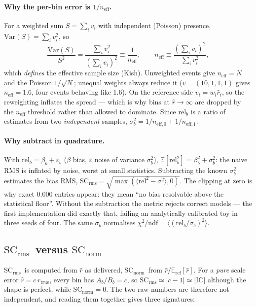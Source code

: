 \documentclass[11pt]{article}
\newcommand{\IC}{\ensuremath{\mathrm{IC}}}
\newcommand{\SCr}{\ensuremath{\mathrm{SC_{rms}}}}
\newcommand{\SCn}{\ensuremath{\mathrm{SC_{norm}}}}
\newcommand{\Eref}{\ensuremath{\mathbb{E}_{\mathrm{ref}}}}
\begin{document}
\paragraph{Why the per-bin error is $1/n_{\mathrm{eff}}$.} For a weighted sum
$S=\sum_i v_i$ with independent (Poisson) presence, $\mathrm{Var}(S)=\sum_i v_i^2$, so
%
\begin{equation}
\frac{\mathrm{Var}(S)}{S^2}=\frac{\sum_i v_i^2}{(\sum_i v_i)^2}\equiv\frac{1}{n_{\mathrm{eff}}},
\qquad n_{\mathrm{eff}}\equiv\frac{(\sum_i v_i)^2}{\sum_i v_i^2},
\end{equation}
%
which \emph{defines} the effective sample size (Kish). Unweighted events give
$n_{\mathrm{eff}}=N$ and the Poisson $1/\sqrt N$; unequal weights always reduce it
($v=(10,1,1,1)$ gives $n_{\mathrm{eff}}=1.6$, four events behaving like 1.6). On the
reference side $v_i = w_i\hat r_i$, so the reweighting inflates the spread --- which is why
bins at $\hat r\to\infty$ are dropped by the $n_{\mathrm{eff}}$ threshold rather than
allowed to dominate. Since $\mathrm{rel}_b$ is a ratio of estimates from two
\emph{independent} samples, $\sigma_b^2 = 1/n_{\mathrm{eff},0}+1/n_{\mathrm{eff},1}$.

\paragraph{Why subtract in quadrature.} With
$\mathrm{rel}_b=\beta_b+\varepsilon_b$ ($\beta$ bias, $\varepsilon$ noise of variance
$\sigma_b^2$), $\mathbb{E}[\mathrm{rel}_b^2]=\beta_b^2+\sigma_b^2$: the naive RMS is
inflated by noise, worst at small statistics. Subtracting the known $\sigma_b^2$ estimates
the bias RMS, $\SCr=\sqrt{\max(\langle\mathrm{rel}^2-\sigma^2\rangle,0)}$. The clipping at
zero is why exact $0.000$ entries appear: they mean ``no bias resolvable above the
statistical floor''. Without the subtraction the metric rejects correct models --- the
first implementation did exactly that, failing an analytically calibrated toy in three
seeds of four. The same $\sigma_b$ normalises
$\chi^2/\mathrm{ndf}=\langle(\mathrm{rel}_b/\sigma_b)^2\rangle$.

\subsection{\SCr\ versus \SCn}

\SCr\ is computed from $\hat r$ as delivered, \SCn\ from $\hat r/\Eref[\hat r]$. For a
\emph{pure} scale error $\hat r = c\,r_{\mathrm{true}}$, every bin has $A_b/B_b = c$, so
$\SCr\simeq|c-1|\simeq|\IC|$ although the shape is perfect, while $\SCn = 0$. The two raw
numbers are therefore not independent, and reading them together gives three signatures:
\end{document}
